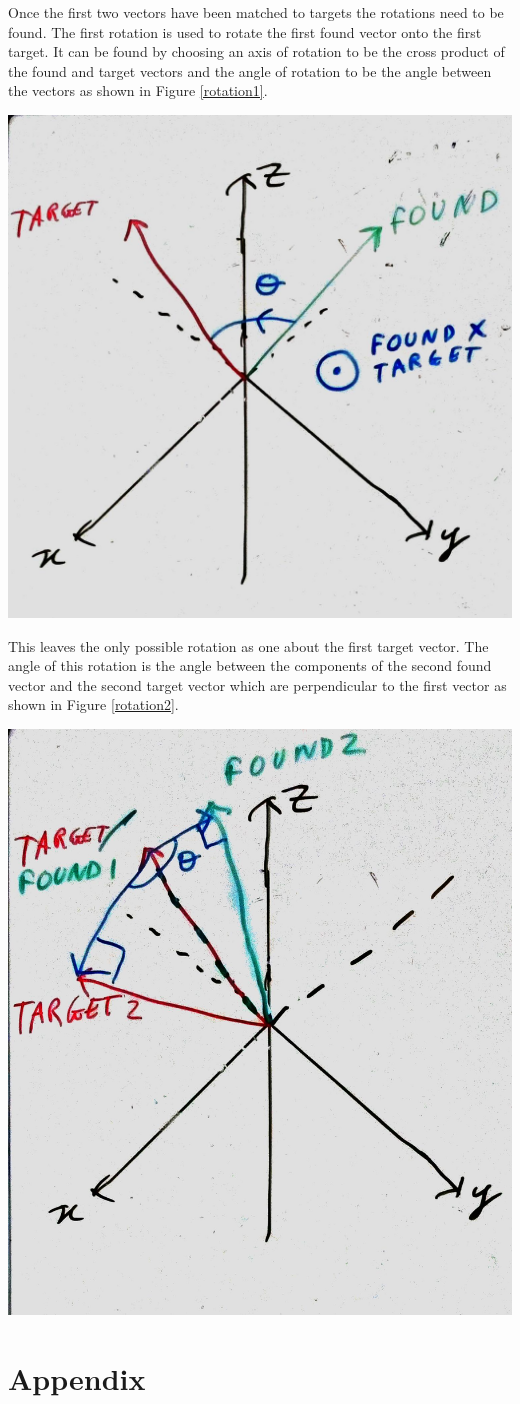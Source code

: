 \documentclass[10pt,a4paper]{article}
\begin{document}
\begin{multicols}{2}
Once the first two vectors have been matched to targets the rotations need to be found. The first rotation is used to rotate the first found vector onto the first target. It can be found by choosing an axis of rotation to be the cross product of the found and target vectors and the angle of rotation to be the angle between the vectors as shown in Figure \ref{rotation1}.
\begin{center}
\includegraphics [width=5 cm]{rotation1.jpg}
\label{rotation1}
\end{center}
This leaves the only possible rotation as one about the first target vector. The angle of this rotation is the angle between the components of the second found vector and the second target vector which are perpendicular to the first vector as shown in Figure \ref{rotation2}.
\begin{center}
\includegraphics [width=5 cm]{rotation2.jpg}
\label{rotation2}
\end{center}





\end{multicols}






\section*{Appendix}
\end{document}
